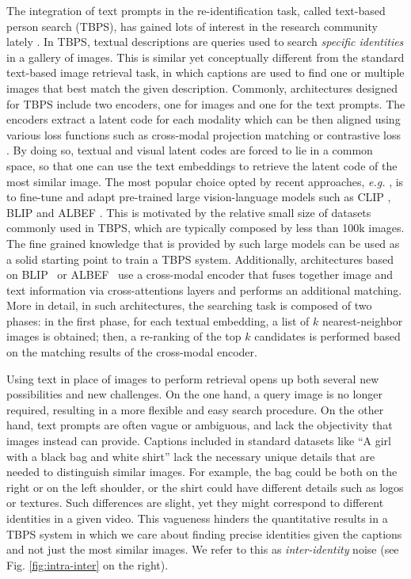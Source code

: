 \documentclass[acmsmall]{acmart}
\begin{document}
The integration of text prompts in the re-identification task, called text-based person search (TBPS), has gained lots of interest in the research community lately \cite{bai2023rasa, niu2024comprehensive}. In TBPS, textual descriptions are queries used to search \textit{specific identities} in a gallery of images. This is similar yet conceptually different from the standard text-based image retrieval task, in which captions are used to find one or multiple images that best match the given description. Commonly, architectures designed for TBPS include two encoders, one for images and one for the text prompts. The encoders extract a latent code for each modality which can be then aligned using various loss functions such as cross-modal projection matching \cite{zhang2018deep} or contrastive loss \cite{bai2023text}. By doing so, textual and visual latent codes are forced to lie in a common space, so that one can use the text embeddings to retrieve the latent code of the most similar image. The most popular choice opted by recent approaches, \textit{e.g.} \cite{jiang2023cross, bai2023rasa, lin2024cross}, is to fine-tune and adapt pre-trained large vision-language models such as CLIP \cite{yan2023clip}, BLIP \cite{li2022blip} and ALBEF \cite{li2021align}. This is motivated by the relative small size of datasets commonly used in TBPS, which are typically composed by less than 100k images. The fine grained knowledge that is provided by such large models can be used as a solid starting point to train a TBPS system. Additionally, architectures based on BLIP~\cite{lin2024cross} or ALBEF~\cite{bai2023rasa} use a cross-modal encoder that fuses together image and text information via cross-attentions layers and performs an additional matching. More in detail, in such architectures, the searching task is composed of two phases: in the first phase, for each textual embedding, a list of $k$ nearest-neighbor images is obtained; then, a re-ranking of the top $k$ candidates is performed based on the matching results of the cross-modal encoder. 

Using text in place of images to perform retrieval opens up both several new possibilities and new challenges. On the one hand, a query image is no longer required, resulting in a more flexible and easy search procedure. On the other hand, text prompts are often vague or ambiguous, and lack the objectivity that images instead can provide. Captions included in standard datasets like ``A girl with a black bag and white shirt'' lack the necessary unique details that are needed to distinguish similar images. For example, the bag could be both on the right or on the left shoulder, or the shirt could have different details such as logos or textures. Such differences are slight, yet they might correspond to different identities in a given video. This vagueness hinders the quantitative results in a TBPS system in which we care about finding precise identities given the captions and not just the most similar images. We refer to this as \textit{inter-identity} noise (see Fig. \ref{fig:intra-inter} on the right).
\end{document}
